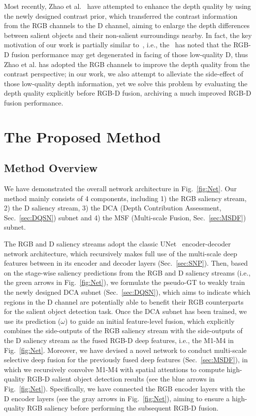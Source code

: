 \documentclass[journal]{IEEEtran}
\begin{document}
Most recently, Zhao et al.~\cite{zhao2019contrast} have attempted to enhance the depth quality by using the newly designed contrast prior, which transferred the contrast information from the RGB channels to the D channel, aiming to enlarge the depth differences between salient objects and their non-salient surroundings nearby.
In fact, the key motivation of our work is partially similar to~\cite{zhao2019contrast}, i.e., the~\cite{zhao2019contrast} has noted that the RGB-D fusion performance may get degenerated in facing of those low-quality D, thus Zhao et al. has adopted the RGB channels to improve the depth quality from the contrast perspective; in our work, we also attempt to alleviate the side-effect of those low-quality depth information, yet we solve this problem by evaluating the depth quality explicitly before RGB-D fusion, archiving a much improved RGB-D fusion performance.

\section{The Proposed Method}
\subsection{Method Overview}
We have demonstrated the overall network architecture in Fig.~\ref{fig:Net}.
Our method mainly consists of 4 components, including 1) the RGB saliency stream, 2) the D saliency stream, 3) the DCA (Depth Contribution Assessment, Sec.~\ref{sec:DQSN}) subnet and 4) the MSF (Multi-scale Fusion, Sec.~\ref{sec:MSDF}) subnet.

The RGB and D saliency streams adopt the classic UNet~\cite{ronneberger2015u} encoder-decoder network architecture, which recursively makes full use of the multi-scale deep features between in its encoder and decoder layers (Sec.~\ref{sec:SNP}).
Then, based on the stage-wise saliency predictions from the RGB and D saliency streams (i.e., the green arrows in Fig.~\ref{fig:Net}), we formulate the pseudo-GT to weakly train the newly designed DCA subnet (Sec.~\ref{sec:DQSN}), which aims to indicate which regions in the D channel are potentially able to benefit their RGB counterparts for the salient object detection task.
Once the DCA subnet has been trained, we use its prediction ($\omega$) to guide an initial feature-level fusion, which explicitly combines the side-outputs of the RGB saliency stream with the side-outputs of the D saliency stream as the fused RGB-D deep features, i.e., the M1-M4 in Fig.~\ref{fig:Net}.
Moreover, we have devised a novel network to conduct multi-scale selective deep fusion for the previously fused deep features (Sec.~\ref{sec:MSDF}), in which we recursively convolve M1-M4 with spatial attentions to compute high-quality RGB-D salient object detection results (see the blue arrows in Fig.~\ref{fig:Net}).
Specifically, we have connected the RGB encoder layers with the D encoder layers (see the gray arrows in Fig.~\ref{fig:Net}), aiming to ensure a high-quality RGB saliency before performing the subsequent RGB-D fusion.
\end{document}

